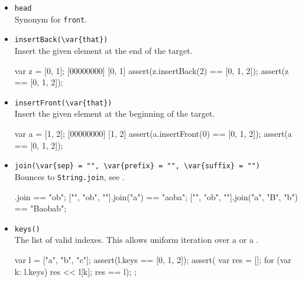\begin{itemize}
\begin{urbiscript}[firstnumber=last]
var y = 1;
[00000000:hide] 1
[0, y, 2].hasSame(1);
[00000000] false
[0, y, 2].hasSame(y);
[00000000] true
\end{urbiscript}

\item \lstinline|head|\\
  Synonym for \lstinline|front|.

\item \lstinline|insertBack(\var{that})|\\
  Insert the given element at the end of the target.

\begin{urbiscript}[firstnumber=last]
var z = [0, 1];
[00000000] [0, 1]
assert(z.insertBack(2) == [0, 1, 2]);
assert(z == [0, 1, 2]);
\end{urbiscript}

\item \lstinline|insertFront(\var{that})|\\
  Insert the given element at the beginning of the target.

\begin{urbiscript}[firstnumber=last]
var a = [1, 2];
[00000000] [1, 2]
assert(a.insertFront(0) == [0, 1, 2]);
assert(a == [0, 1, 2]);
\end{urbiscript}

\item \lstinline|join(\var{sep} = "", \var{prefix} = "", \var{suffix} = "")|\\
  Bounces to \lstinline|String.join|, see .

\begin{urbiassert}[firstnumber=last]
["", "ob", ""].join                == "ob";
["", "ob", ""].join("a")           == "aoba";
["", "ob", ""].join("a", "B", "b") == "Baobab";
\end{urbiassert}

\item \lstinline|keys()|\\
  The list of valid indexes.  This allows uniform iteration over a
   or a .

\begin{urbiscript}[firstnumber=last]
{
  var l = ["a", "b", "c"];
  assert(l.keys == [0, 1, 2]);
  assert({
           var res = [];
           for (var k: l.keys)
             res << l[k];
           res
         }
         == l);
};
\end{urbiscript}


\end{itemize}
